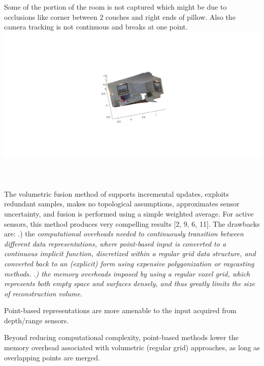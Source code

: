 \documentclass[fleqn]{article}
\begin{document}
\begin{adjustwidth}{4em}{0pt}
	Some of the portion of the room is not captured which might be due to occlusions like corner between 2 couches and right ends of pillow. Also the camera tracking is not continuous and breaks at one point. \\
	\includegraphics[width = 2.5\textwidth,center]{slam_hw3_q1_d_pic3.jpg}\\ \\
	
\end{adjustwidth}

\section{}
\subsection{}
\begin{adjustwidth}{4em}{0pt}
	The volumetric fusion method of supports incremental updates, exploits redundant samples, makes no topological assumptions, approximates sensor uncertainty, and fusion is performed using a simple weighted average. For active sensors, this method produces very compelling results [2, 9, 6, 11]. The
	drawbacks are: .) the \itshape{computational overheads} needed to continuously transition between different data representations, where point-based input is converted to a continuous implicit function, discretized within a regular grid data structure, and converted back to an (explicit) form using expensive polygonization or raycasting methods. .) the \itshape{memory overheads} imposed by using a regular voxel grid, which represents both empty space and surfaces densely, and thus greatly limits the size of reconstruction volume. \newline
	
	Point-based representations are more amenable to the input acquired from depth/range sensors.\newline
	
	Beyond reducing computational complexity, point-based methods lower the memory overhead associated with volumetric (regular grid) approaches, as long as overlapping points are merged.
	
\end{adjustwidth}
\end{document}

